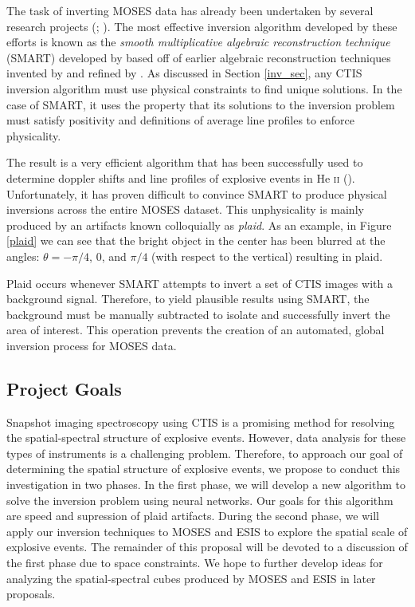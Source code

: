 \documentclass[10pt, letter]{article}
\begin{document}
			The task of inverting MOSES data has already been undertaken by several research projects (\cite{inversion}; \cite{fox1}). The most effective inversion algorithm developed by these efforts is known as the \textit{smooth multiplicative algebraic reconstruction technique} (SMART) developed by \cite{kankel2} based off of earlier algebraic reconstruction techniques invented by \cite{Gordon70} and refined by \cite{Okamoto:91}. As discussed in Section \ref{inv_sec}, any CTIS inversion algorithm must use physical constraints to find unique solutions. In the case of SMART, it uses the property that its solutions to the inversion problem must satisfy positivity and definitions of average line profiles to enforce physicality.
						
			The result is a very efficient algorithm that has been successfully used to determine doppler shifts and line profiles of explosive events in He \textsc{ii} (\cite{rust1}).
			Unfortunately, it has proven difficult to convince SMART to produce physical inversions across the entire MOSES dataset. This unphysicality is mainly produced by an artifacts known colloquially as \textit{plaid}. As an example, in Figure \ref{plaid} we can see that the bright object in the center has been blurred at the angles: $\theta=-\pi/4$, 0, and $\pi/4$ (with respect to the vertical) resulting in plaid. 
					
			Plaid occurs whenever SMART attempts to invert a set of CTIS images with a background signal. Therefore, to yield plausible results using SMART, the background must be manually subtracted to isolate and successfully invert the area of interest. This operation prevents the creation of an automated, global inversion process for MOSES data.

		\subsection{Project Goals}
		
			Snapshot imaging spectroscopy using CTIS is a promising method for resolving the spatial-spectral structure of explosive events. However, data analysis for these types of instruments is a challenging problem.
			Therefore, to approach our goal of determining the spatial structure of explosive events, we propose to conduct this investigation in two phases. In the first phase, we will develop a new algorithm to solve the inversion problem using neural networks. Our goals for this algorithm are speed and supression of plaid artifacts. During the second phase, we will apply our inversion techniques to MOSES and ESIS to explore the spatial scale of explosive events. The remainder of this proposal will be devoted to a discussion of the first phase due to space constraints. We hope to further develop ideas for analyzing the spatial-spectral cubes produced by MOSES and ESIS in later proposals. 
		
\end{document}
